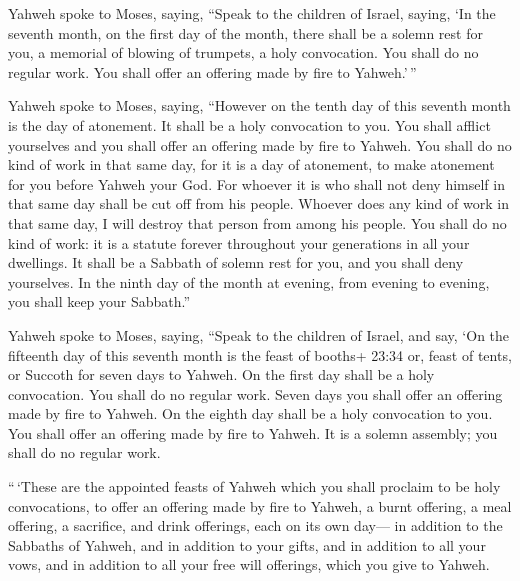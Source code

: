  Yahweh spoke to Moses, saying,  ``Speak to
the children of Israel, saying, `In the seventh month, on the first day
of the month, there shall be a solemn rest for you, a memorial of
blowing of trumpets, a holy convocation.  You shall do no
regular work. You shall offer an offering made by fire to Yahweh.'\,''

 Yahweh spoke to Moses, saying,  ``However on
the tenth day of this seventh month is the day of atonement. It shall be
a holy convocation to you. You shall afflict yourselves and you shall
offer an offering made by fire to Yahweh.  You shall do no
kind of work in that same day, for it is a day of atonement, to make
atonement for you before Yahweh your God.  For whoever it
is who shall not deny himself in that same day shall be cut off from his
people.  Whoever does any kind of work in that same day, I
will destroy that person from among his people.  You shall
do no kind of work: it is a statute forever throughout your generations
in all your dwellings.  It shall be a Sabbath of solemn
rest for you, and you shall deny yourselves. In the ninth day of the
month at evening, from evening to evening, you shall keep your
Sabbath.''

 Yahweh spoke to Moses, saying,  ``Speak to
the children of Israel, and say, `On the fifteenth day of this seventh
month is the feast of booths+ 23:34 or, feast of tents, or Succoth for
seven days to Yahweh.  On the first day shall be a holy
convocation. You shall do no regular work.  Seven days you
shall offer an offering made by fire to Yahweh. On the eighth day shall
be a holy convocation to you. You shall offer an offering made by fire
to Yahweh. It is a solemn assembly; you shall do no regular work.

 ``\,`These are the appointed feasts of Yahweh which you
shall proclaim to be holy convocations, to offer an offering made by
fire to Yahweh, a burnt offering, a meal offering, a sacrifice, and
drink offerings, each on its own day---  in addition to the
Sabbaths of Yahweh, and in addition to your gifts, and in addition to
all your vows, and in addition to all your free will offerings, which
you give to Yahweh.

